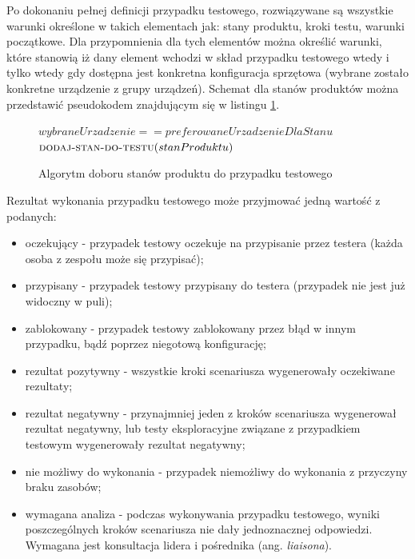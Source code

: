 Po dokonaniu pełnej definicji przypadku testowego, rozwiązywane są wszystkie warunki określone w takich elementach jak: stany produktu, kroki testu, warunki początkowe. Dla przypomnienia dla tych elementów można określić warunki, które stanowią iż dany element wchodzi w skład przypadku testowego wtedy i tylko wtedy gdy dostępna jest konkretna konfiguracja sprzętowa (wybrane zostało konkretne urządzenie z grupy urządzeń). Schemat dla stanów produktów można przedstawić pseudokodem znajdującym się w listingu \ref{lst:doborWarunkow}.
\begin{figure}[h]
	\begin{codebox}
	\li {}
	\li \Do   
	\li \Do
	     \If $wybraneUrzadzenie  ==  preferowaneUrzadzenieDlaStanu$
	\li     \Then
	           $\textnormal{\scshape dodaj-stan-do-testu}(stanProduktu)$	         	         
	        \End	        
	\li  \End	 
	\li
	  \End
	  
	\end{codebox}
	\caption{ Algorytm doboru stanów produktu do przypadku testowego }
	\label{lst:doborWarunkow}
\end{figure}
\newpage

Rezultat wykonania przypadku testowego może przyjmować jedną wartość z podanych:
\begin{itemize}
   \item oczekujący - przypadek testowy oczekuje na przypisanie przez testera (każda osoba z zespołu może się przypisać);
   \item przypisany - przypadek testowy przypisany do testera (przypadek nie jest już widoczny w puli);
   \item zablokowany - przypadek testowy zablokowany przez błąd w innym przypadku, bądź poprzez niegotową konfigurację;
   \item rezultat pozytywny - wszystkie kroki scenariusza wygenerowały oczekiwane rezultaty;
   \item rezultat negatywny - przynajmniej jeden z kroków scenariusza wygenerował rezultat negatywny, lub testy eksploracyjne związane z przypadkiem testowym wygenerowały rezultat negatywny;
   \item nie możliwy do wykonania - przypadek niemożliwy do wykonania z przyczyny braku zasobów;
   \item wymagana analiza - podczas wykonywania przypadku testowego, wyniki poszczególnych kroków scenariusza nie dały jednoznacznej odpowiedzi. Wymagana jest konsultacja lidera i pośrednika (ang. \textit{liaisona}).
 \end{itemize} 

